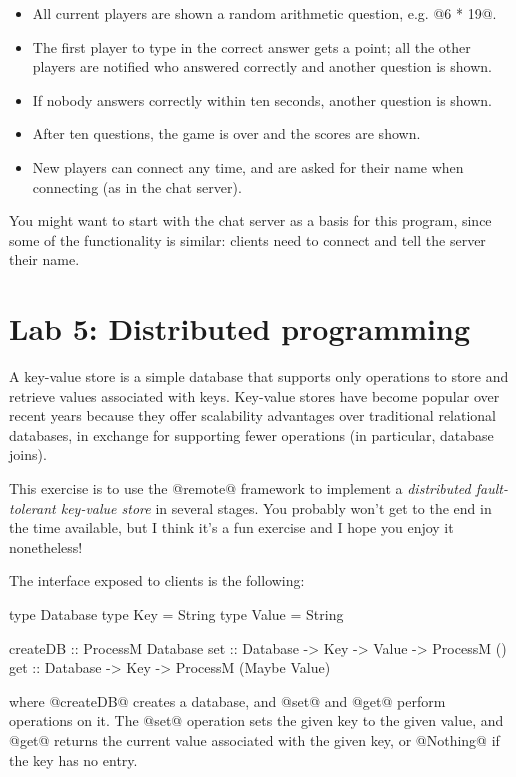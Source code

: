\documentclass[11pt,a4paper]{article}
\newcommand{\Section}[2]{\section{#2}\label{sec:#1}}
\begin{document}
\begin{itemize}
\item All current players are shown a random arithmetic question, e.g. @6 * 19@.
\item The first player to type in the correct answer gets a point; all the other players are notified who answered correctly and another question is shown.
\item If nobody answers correctly within ten seconds, another question is shown.
\item After ten questions, the game is over and the scores are shown.
\item New players can connect any time, and are asked for their name when connecting (as in the chat server).
\end{itemize}

You might want to start with the chat server as a basis for this
program, since some of the functionality is similar: clients need to
connect and tell the server their name.

\newpage\Section{distrib}{Lab 5: Distributed programming}

A key-value store is a simple database that
supports only operations to store and retrieve values associated with
keys.  Key-value stores have become popular over recent years because
they offer scalability advantages over traditional relational
databases, in exchange for supporting fewer operations (in particular,
database joins).

This exercise is to use the @remote@ framework to implement a
\emph{distributed fault-tolerant key-value store} in several stages.
You probably won't get to the end in the time available, but I think
it's a fun exercise and I hope you enjoy it nonetheless!

The interface exposed to clients is the following:

\begin{haskell}
type Database
type Key   = String
type Value = String

createDB :: ProcessM Database
set      :: Database -> Key -> Value -> ProcessM ()
get      :: Database -> Key -> ProcessM (Maybe Value)
\end{haskell}

\noindent where @createDB@ creates a database, and @set@ and @get@
perform operations on it.  The @set@ operation sets the given key to
the given value, and @get@ returns the current value associated with
the given key, or @Nothing@ if the key has no entry.
\end{document}
